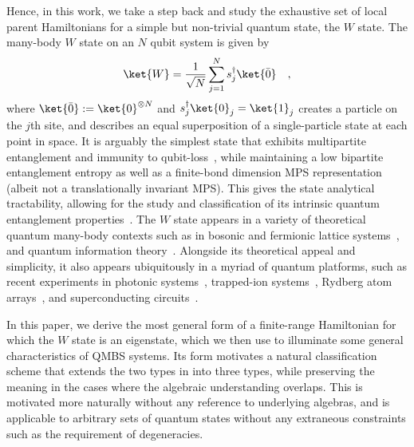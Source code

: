 \documentclass[prx,letterpaper,aps,superscriptaddress,floatfix,twocolumn,nofootinbib]{revtex4-2}
\theoremstyle{definition}
\begin{document}
%
Hence, in this work, we take a step back and study the exhaustive set of local parent Hamiltonians for a simple but non-trivial quantum state, the $W$ state.
%
The many-body $W$ state on an $N$ qubit system is given by
\begin{align}
    \ket{W}=\frac{1}{\sqrt{N}}\sum_{j=1}^N s_j^\dag\ket{\bar{0}}\quad,
\end{align}
where $\ket{\bar{0}}:=\ket{0}^{\otimes N}$ and $s_j^\dag\ket{0}_j=\ket{1}_j$ creates a particle on the $j$th site, and describes an equal superposition of a single-particle state at each point in space.
%
It is arguably the simplest state that exhibits multipartite entanglement and immunity to qubit-loss~\cite{PhysRevA.98.062335}, while maintaining a low bipartite entanglement entropy as well as a finite-bond dimension MPS representation~\cite{RevModPhys.93.045003} (albeit not a translationally invariant MPS).
%
This gives the state analytical tractability, allowing for the study and classification of its intrinsic quantum entanglement properties~\cite{PhysRevA.62.062314}.
%
The $W$ state appears in a variety of theoretical quantum many-body contexts such as in bosonic and fermionic lattice systems~\cite{PhysRevA.75.052109,gioia2024wstateuniqueground}, and quantum information theory~\cite{kieferova2024logdepth}.
%
Alongside its theoretical appeal and simplicity, it also appears ubiquitously in a myriad of quantum platforms, such as recent experiments in photonic systems~\cite{eibl2004experimental}, trapped-ion systems~\cite{haffner2005scalable}, Rydberg atom arrays~\cite{catalano2025experimentalpreparationwstates}, and superconducting circuits~\cite{https://doi.org/10.1002/qute.201900015}.
%

%
In this paper, we derive the most general form of a finite-range Hamiltonian for which the $W$ state is an eigenstate, which we then use to illuminate some general characteristics of QMBS systems.
%
Its form motivates a natural classification scheme that extends the two types in \cite{moudgalya2023exhaustive} into three types, while preserving the meaning in the cases where the algebraic understanding overlaps. 
%
This is motivated more naturally without any reference to underlying algebras, and is applicable to arbitrary sets of quantum states without any extraneous constraints such as the requirement of degeneracies.
%
\end{document}
